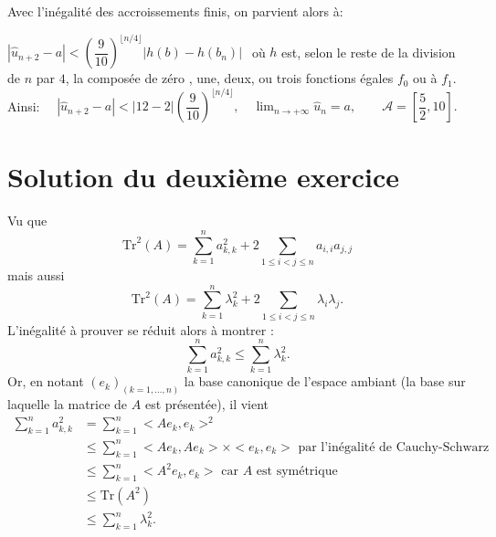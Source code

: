    
Avec l'inégalité des accroissements finis, on parvient alors à: 

$|\widehat u _{n+2} -a | < \left(\dfrac 9{10} \right) ^{\lfloor n/4\rfloor} \Big|h (b) - h(b_n) \Big |\:\:$ où $h$ est, selon le reste de la division de $n$ par $4$, la  composée de zéro , une, deux, ou trois fonctions égales $ f_0$  ou à $f_1$.
Ainsi: $\quad |\widehat u_{n+2} -a |<| 12 - 2| \left(\dfrac 9{10} \right) ^{\lfloor n/4 \rfloor}, \quad \displaystyle \lim_{n \to + \infty} \widehat u_n =a, \qquad \boxed {\mathcal A =\left[ \dfrac 52, 10 \right ].}$ 














\section{Solution du deuxième exercice}

Vu que $$\mbox{Tr}^{2}(A)=\sum_{k=1}^{n}a_{k,k}^{2}+2\sum_{1\leq i<j\leq n}a_{i,i}a_{j,j}$$ mais aussi $$\mbox{Tr}^{2}(A)=\sum_{k=1}^{n}\lambda_{k}^{2}+2\sum_{1\leq i<j\leq n}\lambda_{i}\lambda_{j}.$$
L'inégalité à prouver se réduit alors à montrer : $$\sum_{k=1}^{n}a_{k,k}^{2}\leq \sum_{k=1}^{n}\lambda_{k}^{2}.$$
Or, en notant $(e_{k})_{(k=1,\ldots,n)}$ la base canonique de l'espace ambiant (la base sur laquelle la matrice de $A$ est présentée), il vient
\begin{align*}
\sum_{k=1}^{n}a_{k,k}^{2} & = \sum_{k=1}^{n}<Ae_{k},e_{k}>^{2}\\
& \leq \sum_{k=1}^{n}<Ae_{k},Ae_{k}>\times <e_{k},e_{k}> \mbox{  par l'inégalité de Cauchy-Schwarz }\\
& \leq \sum_{k=1}^{n}<A^{2}e_{k},e_{k}> \mbox{ car } A \mbox{ est symétrique}\\
& \leq \mbox{Tr}(A^{2})\\
& \leq \sum_{k=1}^{n}\lambda_{k}^{2}. 
\end{align*}
 